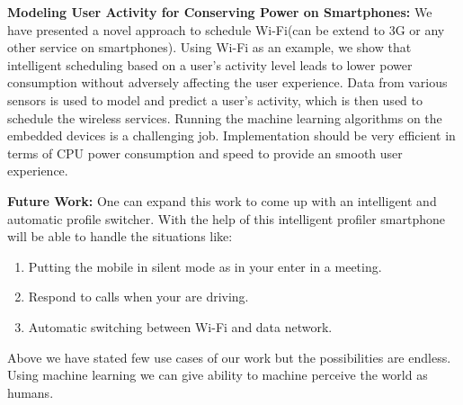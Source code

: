  
\textbf{Modeling User Activity for Conserving Power on Smartphones:}
We have presented a novel approach to schedule Wi-Fi(can be extend to 3G or any other service on smartphones). Using Wi-Fi as an example, we show that intelligent scheduling based on a
user’s activity level leads to lower power consumption without adversely affecting the user experience. Data from various sensors is used to model and predict a user’s activity, which is then used to schedule the wireless services. Running the machine learning algorithms on the embedded devices is a challenging job. Implementation should be very efficient in terms of CPU power consumption and speed to provide an smooth user experience.

\textbf{Future Work:} One can expand this work to come up with an intelligent and automatic profile switcher. With the help of this intelligent profiler smartphone will be able to handle the situations like:

\begin{enumerate}
\item Putting the mobile in silent mode as in your enter in a meeting.
\item Respond to calls when your are driving.
\item Automatic switching between Wi-Fi and data network.
\end{enumerate}

Above we have stated few use cases of our work but the possibilities are endless. Using machine learning we can give ability to machine perceive the world as humans.

